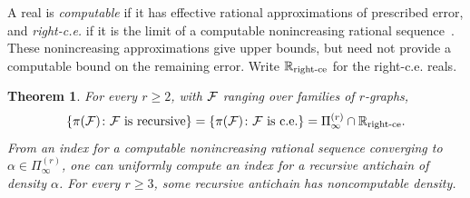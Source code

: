 \documentclass[10pt]{article}
\numberwithin{equation}{section}
\newtheorem{theorem}{Theorem}[section]
\theoremstyle{definition}
\begin{document}
A real is \emph{computable} if it has effective rational approximations of prescribed error, and \emph{right-c.e.} if it is the limit of a computable nonincreasing rational sequence~\cite{Weihrauch2000}. These nonincreasing approximations give upper bounds, but need not provide a computable bound on the remaining error. Write $\mathbb R_{\rm right\text{-}ce}$ for the right-c.e. reals.

\begin{theorem}\label{thm:spectrum}
For every $r\ge2$, with $\mathcal F$ ranging over families of $r$-graphs,
\begin{equation}\label{eq:spectrum}
 \{\pi(\mathcal F)\colon \mathcal F\text{ is recursive}\}
 =\{\pi(\mathcal F)\colon \mathcal F\text{ is c.e.}\}
 =\Pi_\infty^{(r)}\cap\mathbb R_{\rm right\text{-}ce}.
\end{equation}
From an index for a computable nonincreasing rational sequence converging to $\alpha\in\Pi_\infty^{(r)}$, one can uniformly compute an index for a recursive antichain of density $\alpha$. For every $r\ge3$, some recursive antichain has noncomputable density.
\end{theorem}
\end{document}
